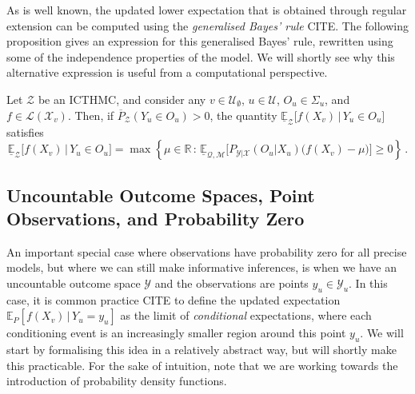 \documentclass[twoside,11pt]{article}
\newcommand{\reals}{\mathbb{R}}
\newcommand{\states}{\mathcal{X}}
\newcommand{\observs}{\mathcal{Y}}
\newcommand{\lexp}{\underline{\mathbb{E}}_{\rateset,\mathcal{M}}}
\newcommand{\gambles}{\mathcal{L}}
\newcommand{\rateset}{\mathcal{Q}}
\begin{document}
As is well known, the updated lower expectation that is obtained through regular extension can be computed using the \emph{generalised Bayes' rule} CITE. The following proposition gives an expression for this generalised Bayes' rule, rewritten using some of the independence properties of the model. We will shortly see why this alternative expression is useful from a computational perspective.
\begin{proposition}\label{prop:GBR_regular}
Let $\mathcal{Z}$ be an ICTHMC, and consider any $v\in\mathcal{U}_\emptyset$, $u\in\mathcal{U}$, $O_u\in\Sigma_u$, and $f\in\gambles(\states_v)$. Then, if $\overline{P}_\mathcal{Z}(Y_u\in O_u) > 0$, the quantity $\underline{\mathbb{E}}_{\mathcal{Z}}\bigl[f(X_v)\,\vert\,Y_u\in O_u\bigr]$ satisfies
\begin{equation*}
\underline{\mathbb{E}}_{\mathcal{Z}}\bigl[f(X_v)\,\vert\,Y_u\in O_u\bigr] = \max\left\{\mu\in\reals\,:\, \lexp\bigl[P_{\observs\vert\states}(O_u\vert X_u)\bigl(f(X_v) - \mu\bigr)\bigr] \geq 0\right\}\,.
\end{equation*}
\end{proposition}

\subsection{Uncountable Outcome Spaces, Point Observations, and Probability Zero}\label{subsec:uncountable}

An important special case where observations have probability zero for all precise models, but where we can still make informative inferences, is when we have an uncountable outcome space $\observs$ and the observations are points $y_u\in\observs_u$. In this case, it is common practice CITE to define the updated expectation $\mathbb{E}_P[f(X_v)\,\vert\,Y_u=y_u]$ as the limit of \emph{conditional} expectations, where each conditioning event is an increasingly smaller region around this point $y_u$. We will start by formalising this idea in a relatively abstract way, but will shortly make this practicable. For the sake of intuition, note that we are working towards the introduction of probability density functions.
\end{document}
